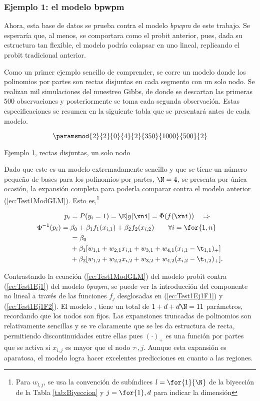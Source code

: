 \subsubsection*{Ejemplo 1: el modelo bpwpm} \label{sec:Test1Ej1}
Ahora, esta base de datos se prueba contra el modelo \textit{bpwpm} de este trabajo. Se esperaría que, al menos, se comportara como el probit anterior, pues, dada su estructura tan flexible, el modelo podría colapsar en uno lineal, replicando el probit tradicional anterior. 

Como un primer ejemplo sencillo de comprender, se corre un modelo donde los polinomios por partes son rectas disjuntas en cada segmento con un solo nodo. Se realizan mil simulaciones del muestreo Gibbs, de donde se descartan las primeras 500 observaciones y posteriormente se toma cada segunda observación. Estas especificaciones se resumen en la siguiente tabla que se presentará antes de cada modelo. 
\begin{table}[H]
$$\paramsmod{2}{2}{0}{4}{2}{350}{1000}{500}{2}$$
\caption{Ejemplo 1, rectas disjuntas, un solo nodo}
\label{ej:1}
\end{table}

Dado que este es un modelo extremadamente sencillo y que se tiene un número pequeño de bases para los polinomios por partes, $\N = 4$, se presenta por única ocasión, la expansión completa para poderla comparar contra el modelo anterior (\ref{ec:Test1ModGLM}). Esto es,\footnote{Para $w_{l,j}$, se usa la convención de subíndices $l = \for{1}{\N}$ de la biyección de la Tabla \ref{tab:Biyeccion} y $j = \for{1},{d}$ para indicar la dimensión}

\begin{align}
	p_i &= P(y_i = 1) =\E[y|\xni] = \Phi(f(\xni))  \quad \Rightarrow  			\nonumber \\
	\Phi^{-1}(p_i) = \;&\beta_0 + \beta_1f_1(x_{i,1}) + \beta_2f_2(x_{i,2}) 
	\qquad 	\forall i = \for{1,n}\label{ec:Test1Ej1} \\
	&= \beta_0 \nonumber \\
	&+ \beta_1[w_{1,1} + w_{2,1}x_{i,1} + w_{3,1} + w_{4,1}(x_{i,1} - \t_{1,1})_+] \label{ec:Test1Ej1F1}\\
	& +\beta_2[w_{1,2} + w_{2,2}x_{i,2} + w_{3,2} + w_{4,2}(x_{i,2} - \t_{1,2})_+]. \label{ec:Test1Ej1F2}
\end{align}

Contrastando la ecuación (\ref{ec:Test1ModGLM}) del modelo probit  contra (\ref{ec:Test1Ej1}) del modelo \textit{bpwpm}, se puede ver la introducción del componente no lineal a través de las funciones $f_j$ desglosadas en (\ref{ec:Test1Ej1F1}) y (\ref{ec:Test1Ej1F2}). El modelo , tiene un total de $1 + d + d\N = 11$ parámetros, recordando que los nodos son fijos. Las expansiones truncadas de polinomios son relativamente sencillas y se ve claramente que se les da estructura de recta, permitiendo discontinuidades entre ellas pues $(\cdot)_+$ es una función por partes que se activa si $x_{i,j}$ es mayor que el nodo $\tau{\cdot,j}$. Aunque esta expansión es aparatosa, el modelo logra hacer excelentes predicciones en cuanto a las regiones. 

